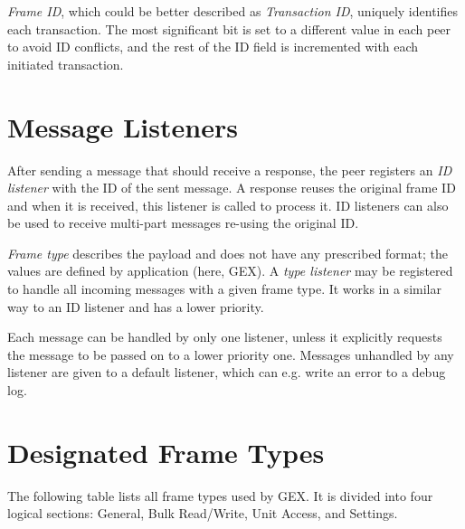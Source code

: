 \textit{Frame ID}, which could be better described as \textit{Transaction ID}, uniquely identifies each transaction. The most significant bit is set to a different value in each peer to avoid ID conflicts, and the rest of the ID field is incremented with each initiated transaction.

\section{Message Listeners}

After sending a message that should receive a response, the peer registers an \textit{ID listener} with the ID of the sent message. A response reuses the original frame ID and when it is received, this listener is called to process it. ID listeners can also be used to receive multi-part messages re-using the original ID.

\textit{Frame type} describes the payload and does not have any prescribed format; the values are defined by application (here, GEX). A \textit{type listener} may be registered to handle all incoming messages with a given frame type. It works in a similar way to an ID listener and has a lower priority.

Each message can be handled by only one listener, unless it explicitly requests the message to be passed on to a lower priority one. Messages unhandled by any listener are given to a default listener, which can e.g. write an error to a debug log.

\section{Designated Frame Types}

The following table lists all frame types used by GEX. It is divided into four logical sections: General, Bulk Read/Write, Unit Access, and Settings.

